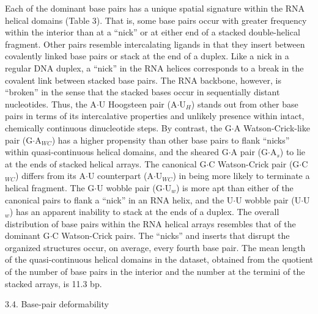 Each of the dominant base  pairs has a unique spatial signature within
the RNA helical domains (Table 3). That is, some base pairs occur with
greater frequency within the interior  than at a ``nick'' or at either
end  of  a  stacked  double-helical  fragment.  Other  pairs  resemble
intercalating ligands  in that  they insert between  covalently linked
base pairs or stack  at the end of a duplex. Like  a nick in a regular
DNA duplex,  a ``nick'' in the  RNA helices corresponds to  a break in
the  covalent  link between  stacked  base  pairs.  The RNA  backbone,
however, is  ``broken'' in the sense  that the stacked  bases occur in
sequentially distant nucleotides.   Thus, the A$\cdot$U Hoogsteen pair
(A$\cdot$U$_{H}$) stands  out from  other base pairs  in terms  of its
intercalative   properties  and   unlikely  presence   within  intact,
chemically continuous  dinucleotide steps. By  contrast, the G$\cdot$A
Watson-Crick-like pair (G$\cdot$A$_{WC}$) has a higher propensity than
other base  pairs to  flank ``nicks'' within  quasi-continuous helical
domains, and  the sheared G$\cdot$A  pair (G$\cdot$A$_{s}$) to  lie at
the  ends   of  stacked   helical  arrays.  The   canonical  G$\cdot$C
Watson-Crick  pair  (G$\cdot$C$_{WC}$)   differs  from  its  A$\cdot$U
counterpart  (A$\cdot$U$_{WC}$) in  being more  likely to  terminate a
helical fragment. The G$\cdot$U  wobble pair (G$\cdot$U$_{w}$) is more
apt than either  of the canonical pairs to flank a  ``nick'' in an RNA
helix, and the U$\cdot$U wobble pair (U$\cdot$U$_{w}$) has an apparent
inability to stack at the  ends of a duplex.  The overall distribution
of  base pairs within  the RNA  helical arrays  resembles that  of the
dominant G$\cdot$C Watson-Crick pairs.  The ``nicks'' and inserts that
disrupt the organized structures  occur, on average, every fourth base
pair. The mean  length of the quasi-continuous helical  domains in the
dataset, obtained from the quotient of the number of base pairs in the
interior and the number at the  termini of the stacked arrays, is 11.3
bp.


3.4. Base-pair deformability

